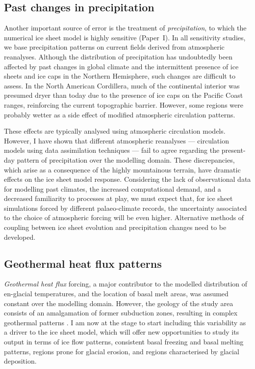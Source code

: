 \documentclass{article}
\newcommand{\CCLI}[0]{Paper~I}      %
\begin{document}
\subsection{Past changes in precipitation}

Another important source of error is the treatment of \emph{precipitation}, to
which
the numerical ice sheet model is highly sensitive (\CCLI). In all sensitivity
studies, we base precipitation patterns on current fields derived from
atmospheric
reanalyses. Although the distribution of precipitation has undoubtedly
been affected by past changes in global climate and the intermittent presence
of ice sheets and ice caps in the Northern Hemisphere, such changes are
difficult to assess. In the North American Cordillera, much of the continental
interior was presumed dryer than today due to the presence of ice caps on the
Pacific Coast ranges, reinforcing the current topographic barrier. However,
some regions were probably wetter as a side effect of modified atmospheric
circulation patterns.

These effects are typically analysed using atmospheric
circulation models. However, I have shown that different atmospheric reanalyses
--- circulation models using data assimilation techniques --- fail to agree
regarding the present-day pattern of precipitation over the modelling domain.
These discrepancies, which arise as a consequence of the highly mountainous
terrain, have dramatic effects on the ice sheet model response. Considering the
lack of observational data for modelling past climates, the increased
computational demand, and a decreased familiarity to processes at play, we must
expect that, for ice sheet simulations forced by different palaeo-climate
records, the uncertainty associated to the choice of atmospheric forcing
will be even higher. Alternative methods of coupling between ice sheet
evolution and precipitation changes need to be developed.


\subsection{Geothermal heat flux patterns}

\emph{Geothermal heat flux} forcing, a major contributor to the modelled
distribution
of en-glacial temperatures, and the location of basal melt areas, was assumed
constant over the modelling domain. However, the geology of the study area
consists of an amalgamation of former subduction zones, resulting in complex
geothermal patterns \citep{Blackwell.Richards.2004}. I am now at the stage to
start including this variability as a driver to the ice sheet model, which will
offer new opportunities to study its output in terms of ice flow patterns,
consistent basal freezing and basal melting patterns, regions prone for glacial
erosion, and regions characterised by glacial deposition.
\end{document}
